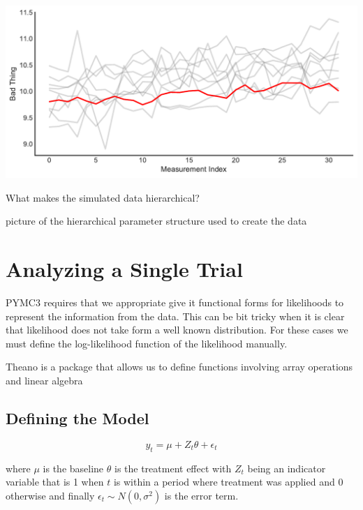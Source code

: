 \documentclass[12pt,a4paper,leqno]{report}
\theoremstyle{plain}
\theoremstyle{definition}
\theoremstyle{remark}
\begin{document}
\bigskip
{
    \centering
    \includegraphics[width=\textwidth,height=\textheight,keepaspectratio]{measurements_timeline.pdf}
    \par
}
\bigskip



What makes the simulated data hierarchical?

picture of the hierarchical parameter structure used to create the data

\section{Analyzing a Single Trial}\label{1trial}

PYMC3 requires that we appropriate give it functional forms for likelihoods to represent the information from the data. This can be bit tricky
when it is clear that likelihood does not take form a well known distribution. For these cases we must define the log-likelihood function
of the likelihood manually.

Theano is a package that allows us to define functions involving array operations and linear algebra

\subsection{Defining the Model}\label{1model}

\begin{def}\label{simulationmodel}
    \begin{equation}\label{}
        y_t = \mu + Z_t\theta + \epsilon_t
    \end{equation}
\end{def}where \(\mu\) is the baseline
\(\theta\) is the treatment effect with \(Z_t\) being an indicator variable that is 1 when
\(t\) is within a period where treatment was applied and 0 otherwise and finally
\(\epsilon_t \sim N(0,\sigma^2) \) is the error term.
\end{document}
